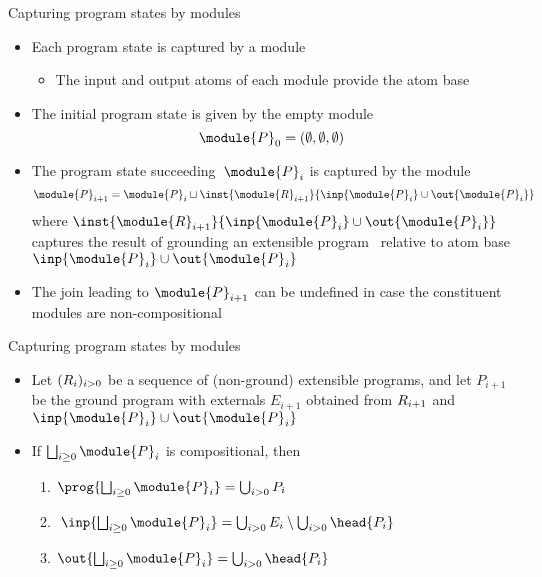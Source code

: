 \begin{frame}{Capturing program states by modules}
  \begin{itemize}
  \item<1-> Each program state is captured by a module
    \begin{itemize}
    \item<2-> The input and output atoms of each module provide the atom base
    \end{itemize}
    \medskip
  \item<3-> The initial program state is given by the empty module
    \[
    \module{P}_0 = (\emptyset,\emptyset,\emptyset)
    \]
  \item<4->
    The program state succeeding~$\module{P}_i$ is captured by the module
    \[ %
      \module{P}_{i+1}
      =
      \module{P}_i
      \sqcup
      \inst{\module{\RRG}_{i+1}}{\inp{\module{P}_i}\cup\out{\module{P}_i}}
    \] %
    where
    \(
    \inst{\module{\RRG}_{i+1}}{\inp{\module{P}_i}\cup\out{\module{P}_i}}
    \)
    captures the result of grounding an extensible program \RRG\ relative to atom base $\inp{\module{P}_i}\cup\out{\module{P}_i}$
    \smallskip
  \item<5->  The join leading to $\module{P}_{i+1}$ can be undefined in case the constituent modules are non-compositional
  \end{itemize}
\end{frame}
\begin{frame}{Capturing program states by modules}
  \begin{itemize}
  \item<1->
Let $(R_i)_{i>0}$ be a sequence of (non-ground) extensible programs,
and let
$P_{i+1}$ be the ground program with externals $E_{i+1}$ obtained from $R_{i+1}$ and $\inp{\module{P}_i}\cup\out{\module{P}_i}$
\bigskip
\item<2->[]
If
\(
\bigsqcup_{i\geq 0}\module{P}_i
\)
is compositional,
then
\medskip
\begin{enumerate}\normalsize
\item
\(
\prog{\bigsqcup_{i\geq 0}\module{P}_i}
=
\bigcup_{i>0} P_i
\)
\smallskip
\item
\(
\;\inp{\bigsqcup_{i\geq 0}\module{P}_i}
=
\bigcup_{i>0} E_i\setminus\bigcup_{i>0} \head{P_i}
\)
\smallskip
\item
\(
\out{\bigsqcup_{i\geq 0}\module{P}_i}
=
\bigcup_{i>0} \head{P_i}
\)
\end{enumerate}
\end{itemize}
\end{frame}
